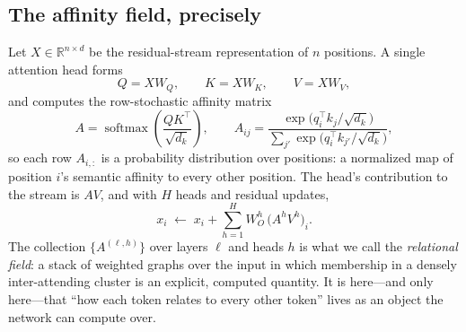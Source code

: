 \documentclass[conference]{IEEEtran}
\theoremstyle{definition}
\newcommand{\softmax}{\operatorname{softmax}}
\newcommand{\R}{\mathbb{R}}
\begin{document}
\subsection{The affinity field, precisely}
Let $X \in \R^{n \times d}$ be the residual-stream representation of $n$ positions. A single attention head forms
\begin{equation}
Q = X W_Q,\qquad K = X W_K,\qquad V = X W_V,
\end{equation}
and computes the row-stochastic affinity matrix
\begin{equation}
A = \softmax\!\left(\frac{Q K^\top}{\sqrt{d_k}}\right), \qquad
A_{ij} = \frac{\exp\!\big(q_i^\top k_j / \sqrt{d_k}\big)}{\sum_{j'} \exp\!\big(q_i^\top k_{j'} / \sqrt{d_k}\big)},
\end{equation}
so each row $A_{i,:}$ is a probability distribution over positions: a normalized map of position $i$'s semantic affinity to every other position. The head's contribution to the stream is $A V$, and with $H$ heads and residual updates,
\begin{equation}
x_i \;\leftarrow\; x_i + \sum_{h=1}^{H} W_O^{h}\, \big(A^{h} V^{h}\big)_i .
\end{equation}
The collection $\{A^{(\ell,h)}\}$ over layers $\ell$ and heads $h$ is what we call the \emph{relational field}: a stack of weighted graphs over the input in which membership in a densely inter-attending cluster is an explicit, computed quantity. It is here---and only here---that ``how each token relates to every other token'' lives as an object the network can compute over.
\end{document}
